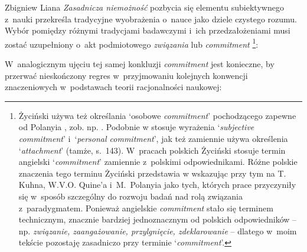 \begin{artplenv}{Zbigniew Liana}
\textit{Zasadnicza niemożność} pozbycia się elementu subiektywnego z~nauki przekreśla tradycyjne wyobrażenia o~nauce jako dziele czystego rozumu. Wybór pomiędzy różnymi tradycjami badawczymi i~ich przedzałożeniami musi zostać uzupełniony o~akt podmiotowego \textit{związania} lub \textit{commitment}
\parencites[][s.~160]{zycinski_teizm_1985}[][s.~186n.191]{zycinski_elementy_1996}[][s.~253n.258]{zycinski_elementy_2015}%
\footnote{Życiński używa też określania ‘osobowe \textit{commitment}' pochodzącego zapewne od Polanyia 
\parencite*[][]{polanyi_personal_1962}, %
 zob. np. 
\parencite[][s.~79.125.165]{zycinski_teizm_1985}. %
 Podobnie w
\parencite[][s.~137.144]{zycinski_structure_1988} %
 stosuje wyrażenia ‘\textit{subjective commitment}' i~‘\textit{personal commitment}', jak też zamiennie używa określenia ‘\textit{attachment}' (tamże, s.~143). W~pracach polskich Życiński stosuje termin angielski ‘\textit{commitment}' zamiennie z~polskimi odpowiednikami. Różne polskie znaczenia tego terminu Życiński przedstawia w
\parencites[][s.~191]{zycinski_elementy_1996}[][s.~259n]{zycinski_elementy_2015} %
 wskazując przy tym na T. Kuhna, W.V.O. Quine'a i~M.~Polanyia jako tych, których prace przyczyniły się w~sposób szczególny do rozwoju badań nad rolą związania z~paradygmatem. Ponieważ angielskie \textit{commitment} stało się terminem technicznym, znacznie bardziej jednoznacznym od polskich odpowiedników -- np. \textit{związanie, zaangażowanie, przylgnięcie, zdeklarowanie} -- dlatego w~moim tekście pozostaję zasadniczo przy terminie ‘\textit{commitment}'.}:



W~analogicznym ujęciu tej samej konkluzji \textit{commitment} jest konieczne, by przerwać nieskończony regres w~przyjmowaniu kolejnych konwencji znaczeniowych w~podstawach teorii racjonalności naukowej:


\end{artplenv}
